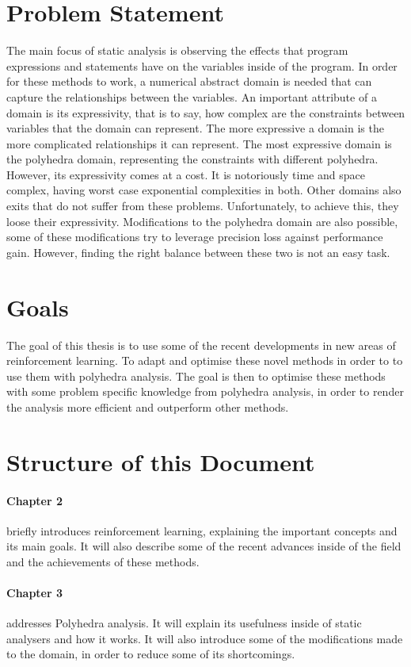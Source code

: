 \section{Problem Statement}
The main focus of static analysis is observing the effects that program expressions and statements have on the variables inside of the program. In order for these methods to work, a numerical abstract domain is needed that can capture the relationships between the variables. An important attribute of a domain is its expressivity, that is to say, how complex are the constraints between variables that the domain can represent. The more expressive a domain is the more complicated relationships it can represent. The most expressive domain is the polyhedra domain, representing the constraints with different polyhedra. However, its expressivity comes at a cost. It is notoriously time and space complex, having worst case exponential complexities in both. Other domains also exits that do not suffer from these problems. Unfortunately, to achieve this, they loose their expressivity. Modifications to the polyhedra domain are also possible, some of these modifications try to leverage precision loss against performance gain. However, finding the right balance between these two is not an easy task.

\section{Goals}
The goal of this thesis is to use some of the recent developments in new areas of reinforcement learning. To adapt and optimise these novel methods in order to to use them with polyhedra analysis. The goal is then to optimise these methods with some problem specific knowledge from polyhedra analysis, in order to render the analysis more efficient and outperform other methods.


\section{Structure of this Document}

\paragraph{Chapter 2}briefly introduces reinforcement learning, explaining the important concepts and its main goals. It will also describe some of the recent advances inside of the field and the achievements of these methods.

\paragraph{Chapter 3}addresses Polyhedra analysis. It will explain its usefulness inside of static analysers and how it works. It will also introduce some of the modifications made to the domain, in order to reduce some of its shortcomings.

